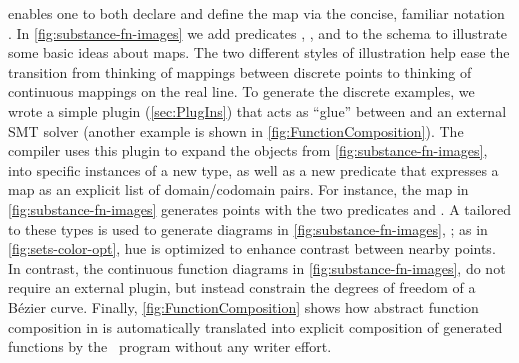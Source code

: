    \noindent enables one to both declare and define the map via the concise, familiar notation .  In \cref{fig:substance-fn-images} we add predicates , , and  to the \Domain{} schema to illustrate some basic ideas about maps.  The two different styles of illustration help ease the transition from thinking of mappings between discrete points to thinking of continuous mappings on the real line.  To generate the discrete examples, we wrote a simple plugin (\cref{sec:PlugIns}) that acts as ``glue'' between \Penrose{} and an external SMT solver (another example is shown in \cref{fig:FunctionComposition}).  The compiler uses this plugin to expand the  objects from \cref{fig:substance-fn-images},  into specific instances of a new  type, as well as a new predicate  that expresses a map as an explicit list of domain/codomain pairs.  For instance, the map in \cref{fig:substance-fn-images} generates points  with the two predicates  and .  A \Style{} tailored to these types is used to generate diagrams in \cref{fig:substance-fn-images}, ; as in \cref{fig:sets-color-opt}, hue is optimized to enhance contrast between nearby points.  In contrast, the continuous function diagrams in \cref{fig:substance-fn-images},  do not require an external plugin, but instead constrain the degrees of freedom of a B\'{e}zier curve.  Finally, \cref{fig:FunctionComposition} shows how abstract function composition in \Substance{} is automatically translated into explicit composition of generated functions by the \Style\ program without any \Substance{} writer effort.


